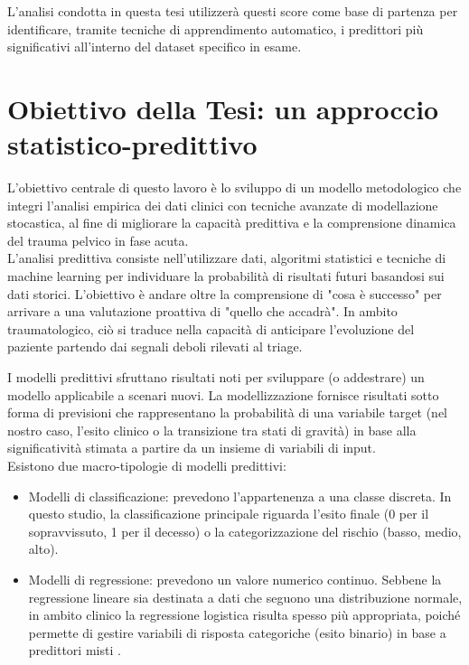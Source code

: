 \documentclass[11pt, oneside, noexaminfo]{sapthesis}   	%
\begin{document}
L'analisi condotta in questa tesi utilizzerà questi score come base di partenza per identificare, tramite tecniche di apprendimento automatico, i predittori più significativi all'interno del dataset specifico in esame.

\section{Obiettivo della Tesi: un approccio statistico-predittivo}
L’obiettivo centrale di questo lavoro è lo sviluppo di un modello metodologico che integri l’analisi empirica dei dati clinici con tecniche avanzate di modellazione stocastica, al fine di migliorare la capacità predittiva e la comprensione dinamica del trauma pelvico in fase acuta.\\

L'analisi predittiva consiste nell’utilizzare dati, algoritmi statistici e tecniche di machine learning per individuare la probabilità di risultati futuri basandosi sui dati storici. L'obiettivo è andare oltre la comprensione di "cosa è successo" per arrivare a una valutazione proattiva di "quello che accadrà". In ambito traumatologico, ciò si traduce nella capacità di anticipare l'evoluzione del paziente partendo dai segnali deboli rilevati al triage.

I modelli predittivi sfruttano risultati noti per sviluppare (o addestrare) un modello applicabile a scenari nuovi. La modellizzazione fornisce risultati sotto forma di previsioni che rappresentano la probabilità di una variabile target (nel nostro caso, l'esito clinico o la transizione tra stati di gravità) in base alla significatività stimata a partire da un insieme di variabili di input.\\

Esistono due macro-tipologie di modelli predittivi:
\begin{itemize}
	\item Modelli di classificazione: prevedono l'appartenenza a una classe discreta. In questo studio, la classificazione principale riguarda l'esito finale (0 per il sopravvissuto, 1 per il decesso) o la categorizzazione del rischio (basso, medio, alto).

	\item Modelli di regressione: prevedono un valore numerico continuo. Sebbene la regressione lineare sia destinata a dati che seguono una distribuzione normale, in ambito clinico la regressione logistica risulta spesso più appropriata, poiché permette di gestire variabili di risposta categoriche (esito binario) in base a predittori misti \cite{james2013introduction}.
\end{itemize}
\end{document}
